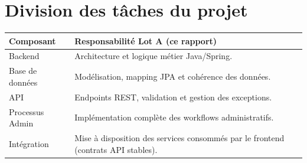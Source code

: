\section{Division des tâches du projet}
\begin{tabularx}{\textwidth}{lX}
\toprule
\textbf{Composant} & \textbf{Responsabilité Lot A (ce rapport)} \\
\midrule
Backend & Architecture et logique métier Java/Spring. \\
Base de données & Modélisation, mapping JPA et cohérence des données. \\
API & Endpoints REST, validation et gestion des exceptions. \\
Processus Admin & Implémentation complète des workflows administratifs. \\
Intégration & Mise à disposition des services consommés par le frontend (contrats API stables). \\
\bottomrule
\end{tabularx}
